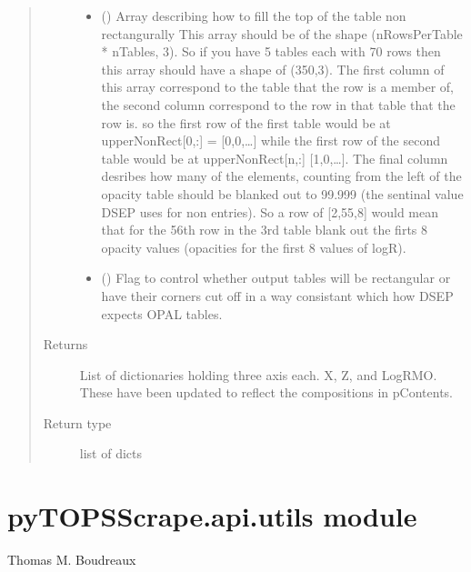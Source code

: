 \documentclass[letterpaper,10pt,english]{sphinxmanual}
\begin{document}
\begin{fulllineitems}
\begin{quote}
\begin{description}
\begin{itemize}
\item {} 
\sphinxAtStartPar
{} () \textendash{} Array describing how to fill the top of the table non rectangurally
This array should be of the shape (nRowsPerTable * nTables, 3). So
if you have 5 tables each with 70 rows then this array should have
a shape of (350,3). The first column of this array correspond to
the table that the row is a member of, the second column correspond
to the row in that table that the row is. so the first row of the
first table would be at upperNonRect{[}0,:{]} = {[}0,0,…{]} while the
first row of the second table would be at upperNonRect{[}n,:{]}
{[}1,0,…{]}. The final column desribes how many of the elements,
counting from the left of the opacity table should be blanked out
to 99.999 (the sentinal value DSEP uses for non entries). So a row
of {[}2,55,8{]} would mean that for the 56th row in the 3rd table blank
out the firts 8 opacity values (opacities for the first 8 values of
logR).

\item {} 
\sphinxAtStartPar
{} (\sphinxstyleliteralemphasis{\sphinxupquote{, }}) \textendash{} Flag to control whether output tables will be rectangular or have
their corners cut off in a way consistant which how DSEP expects
OPAL tables.

\end{itemize}

\item[{Returns}] \leavevmode
\sphinxAtStartPar
{} \textendash{} List of dictionaries holding three axis each. X, Z, and LogRMO.
These have been updated to reflect the compositions in pContents.

\item[{Return type}] \leavevmode
\sphinxAtStartPar
list of dicts

\end{description}\end{quote}

\end{fulllineitems}



\section{pyTOPSScrape.api.utils module}
\label{\detokenize{pyTOPSScrape.api:module-pyTOPSScrape.api.utils}}\label{\detokenize{pyTOPSScrape.api:pytopsscrape-api-utils-module}}
\sphinxAtStartPar
{} Thomas M. Boudreaux
\end{document}
